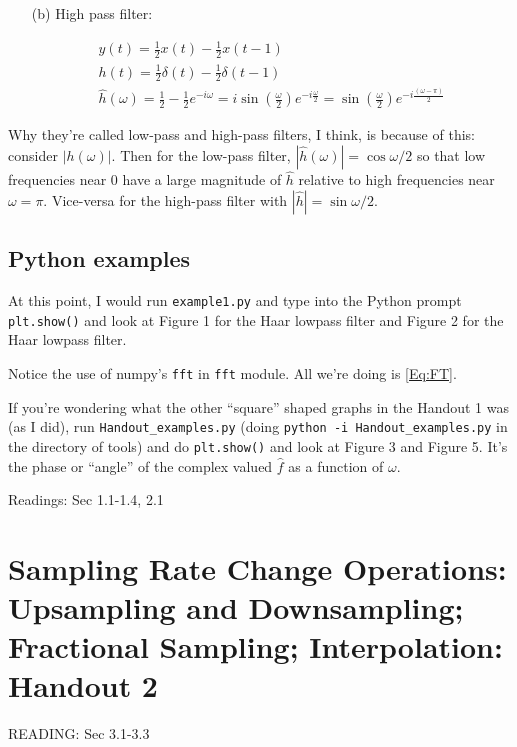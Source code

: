 \documentclass[twoside]{amsart}
\theoremstyle{plain}
\theoremstyle{definition}
\theoremstyle{remark}
\numberwithin{equation}{section}
\begin{document}
\begin{enumerate}
\item[(b)] High pass filter:

\[
\begin{gathered}
  y(t) = \frac{1}{2} x(t) - \frac{1}{2} x(t-1) \\ 
  h(t) = \frac{1}{2} \delta(t) - \frac{1}{2} \delta(t-1) \\
  \widehat{h}(\omega) = \frac{1}{2} - \frac{1}{2} e^{-i\omega} = i \sin{\left( \frac{\omega}{2} \right) } e^{-i \frac{\omega}{2} } = \sin{\left( \frac{\omega}{2} \right) } e^{ -i \frac{ ( \omega - \pi)}{2} }
\end{gathered}
\]
\end{enumerate}

Why they're called low-pass and high-pass filters, I think, is because of this: consider $|h(\omega)|$.  Then for the low-pass filter, $|\widehat{h}(\omega)| = \cos{ \omega/2}$ so that low frequencies near $0$ have a large magnitude of $\widehat{h}$ relative to high frequencies near $\omega = \pi$.  Vice-versa for the high-pass filter with $|\widehat{h}| = \sin{\omega/2}$.  

\subsection*{Python examples}

At this point, I would run \verb|example1.py| and type into the Python prompt \verb|plt.show()| and look at Figure 1 for the Haar lowpass filter and Figure 2 for the Haar lowpass filter.  

Notice the use of numpy's \verb|fft| in \verb|fft| module.  All we're doing is \ref{Eq:FT}.  

If you're wondering what the other ``square'' shaped graphs in the Handout 1 was (as I did), run \verb|Handout_examples.py| (doing \verb|python -i Handout_examples.py| in the directory of tools) and do \verb|plt.show()| and look at Figure 3 and Figure 5.  It's the phase or ``angle'' of the complex valued $\widehat{f}$ as a function of $\omega$.  

Readings: Sec 1.1-1.4, 2.1 \cite{GStrangTNguyen1996}

\section{Sampling Rate Change Operations: Upsampling and Downsampling; Fractional Sampling; Interpolation: Handout 2}

READING: Sec 3.1-3.3 \cite{GStrangTNguyen1996}
\end{document}
